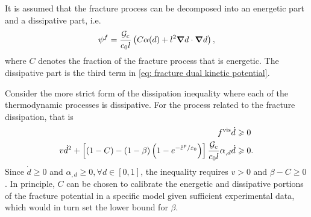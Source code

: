 It is assumed that the fracture process can be decomposed into an energetic part and a dissipative part, i.e.
\begin{align}
  \psi^f = \dfrac{{\mathcal{G}_c}}{c_0 l} \left( C\alpha(d) + l^2 \boldsymbol{\nabla} d \cdot \boldsymbol{\nabla} d \right), \label{eq: modified fracture energy} \\
\end{align}
where $C$ denotes the fraction of the fracture process that is energetic. The dissipative part is the third term in \eqref{eq: fracture dual kinetic potential}.

\begin{remark}
  Consider the more strict form of the dissipation inequality where each of the thermodynamic processes is dissipative. For the process related to the fracture dissipation, that is
  \begin{align*}
    f^\text{vis} \dot{d}                                                                                                           & \geqslant 0  \\
    v \dot{d}^2 + \left[ (1-C) - (1-\beta) \left( 1-e^{-\ep/\varepsilon_0} \right) \right] \dfrac{\Gc}{c_0 l} \alpha_{, d} \dot{d} & \geqslant 0. 
  \end{align*}
  Since $\dot{d} \geqslant 0$ and $\alpha_{, d} \geqslant 0, \forall d \in [0, 1]$, the inequality requires $v > 0$ and $\beta - C \geqslant 0$.  In principle, $C$ can be chosen to calibrate the energetic and dissipative portions of the fracture potential in a specific model given sufficient experimental data, which would in turn set the lower bound for $\beta$.
\end{remark}


